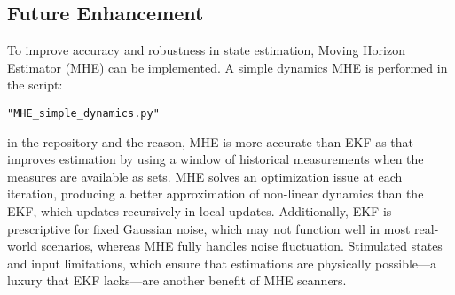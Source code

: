 \documentclass[a4paper,11pt]{article}
\begin{document}
\subsection*{Future Enhancement}
To improve accuracy and robustness in state estimation, Moving Horizon Estimator (MHE) can be implemented. A simple dynamics MHE is performed in the script:
\begin{verbatim}
"MHE_simple_dynamics.py"
\end{verbatim}
in the repository and the reason, MHE is more accurate than EKF as that improves estimation by using a window of historical measurements when the measures are available as sets. MHE solves an optimization issue at each iteration, producing a better approximation of non-linear dynamics than the EKF, which updates recursively in local updates. Additionally, EKF is prescriptive for fixed Gaussian noise, which may not function well in most real-world scenarios, whereas MHE fully handles noise fluctuation. Stimulated states and input limitations, which ensure that estimations are physically possible—a luxury that EKF lacks—are another benefit of MHE scanners. 
\end{document}
